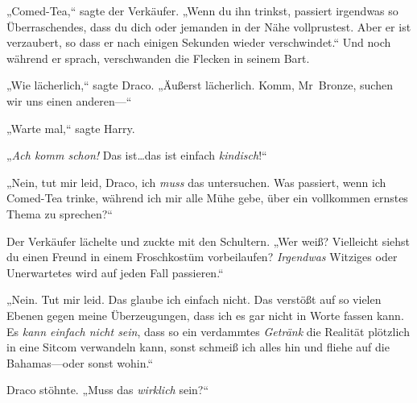 „Comed-Tea,“ sagte der Verkäufer. „Wenn du ihn trinkst, passiert irgendwas so Überraschendes, dass du dich oder jemanden in der Nähe vollprustest. Aber er ist verzaubert, so dass er nach einigen Sekunden wieder verschwindet.“ Und noch während er sprach, verschwanden die Flecken in seinem Bart.

„Wie lächerlich,“ sagte Draco. „Äußerst lächerlich. Komm, Mr~Bronze, suchen wir uns einen anderen—“

„Warte mal,“ sagte Harry.

„\emph{Ach komm schon!} Das ist…das ist einfach \emph{kindisch}!“

„Nein, tut mir leid, Draco, ich \emph{muss} das untersuchen. Was passiert, wenn ich Comed-Tea trinke, während ich mir alle Mühe gebe, über ein vollkommen ernstes Thema zu sprechen?“

Der Verkäufer lächelte und zuckte mit den Schultern. „Wer weiß? Vielleicht siehst du einen Freund in einem Froschkostüm vorbeilaufen? \emph{Irgendwas} Witziges oder Unerwartetes wird auf jeden Fall passieren.“

„Nein. Tut mir leid. Das glaube ich einfach nicht. Das verstößt auf so vielen Ebenen gegen meine Überzeugungen, dass ich es gar nicht in Worte fassen kann. Es \emph{kann einfach nicht sein}, dass so ein verdammtes \emph{Getränk} die Realität plötzlich in eine Sitcom verwandeln kann, sonst schmeiß ich alles hin und fliehe auf die Bahamas—oder sonst wohin.“

Draco stöhnte. „Muss das \emph{wirklich} sein?“


